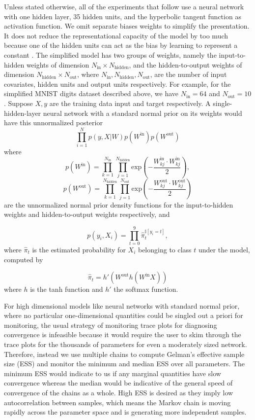 \documentclass[12pt]{report}
\begin{document}
Unless stated otherwise, all of the experiments that follow use a neural network with one hidden layer, 35 hidden units, and the hyperbolic tangent function as activation function. We omit separate biases weights to simplify the presentation. It does not reduce the representational capacity of the model by too much because one of the hidden units can act as the bias by learning to represent a constant \cite{bishop1995neural}. The simplified model has two groups of weights, namely the input-to-hidden weights of dimension $N_{\text{in}} \times N_{\text{hidden}}$, and the hidden-to-output weights of dimension $N_{\text{hidden}} \times N_{\text{out}} $, where $N_{\text{in}},N_{\text{hidden}},N_{\text{out}}$, are the number of input covariates, hidden units and output units respectively. For example, for the simplified MNIST digits dataset described above, we have $N_{\text{in}} = 64 $ and $N_{\text{out}} = 10 $. Suppose $X,y$ are the training data input and target respectively. A single-hidden-layer neural network with a standard normal prior on its weights would have this unnormalized posterior 
\[ \prod_{i=1}^N p(y,X|W) p(W^{\text{in}})p(W^{\text{out}}) \]
where 
\[p(W^{\text{in}}) = \prod_{k=1}^{N_{\text{in}}}\prod_{j=1}^{N_{\text{hidden}}} \text{exp}\left(- \frac{W_{kj}^{\text{in}} \cdot W_{kj}^{\text{in}}}{2}\right), \]
\[p(W^{\text{out}}) = \prod_{k=1}^{N_{\text{hidden}}}\prod_{j=1}^{N_{\text{out}}} \text{exp}\left(- \frac{W_{kj}^{\text{out}} \cdot W_{kj}^{\text{out}}}{2}\right) \]
are the unnormalized normal prior density functions for the input-to-hidden weights and hidden-to-output weights respectively, and 

\[ p(y_i,X_i) = \prod_{t=0}^9 \hat{\pi}_t^{\mathbb{I}[y_i=t]}, \]
where $\hat{\pi}_t$ is the estimated probability for $X_i$ belonging to class $t$ under the model, computed by 

\[\hat{\pi}_t =   h'(W^{\text{out}}h(W^{\text{in}}X)) \]
where $h$ is the tanh function and $h'$ the softmax function.

For high dimensional models like neural networks with standard normal prior, where no particular one-dimensional quantities could be singled out a priori for monitoring, the usual strategy of monitoring trace plots for diagnosing convergence is infeasible because it would require the user to skim through the trace plots for the thousands of parameters for even a moderately sized network. Therefore, instead we use multiple chains to compute Gelman's effective sample size (ESS) \cite{gelman2014bayesian} and monitor the minimum and median ESS over all parameters. The minimum ESS would indicate to us if any marginal quantities have slow convergence whereas the median would be indicative of the general speed of convergence of the chains as a whole. High ESS is desired as they imply low autocorrelation between samples, which means the Markov chain is moving rapidly across the parameter space and is generating more independent samples.
\end{document}

